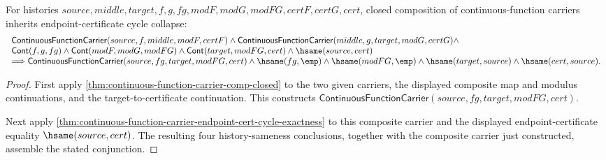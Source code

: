 \begin{theorem}
\label{thm:continuous-function-carrier-composite-endpoint-cycle-exactness}
For histories $source,middle,target,f,g,fg,modF,modG,modFG,certF,certG,cert$,
closed composition of continuous-function carriers inherits endpoint-certificate
cycle collapse:
$$
\begin{array}{l}
\mathsf{ContinuousFunctionCarrier}(source,f,middle,modF,certF)\wedge
\mathsf{ContinuousFunctionCarrier}(middle,g,target,modG,certG)\wedge
\\
\mathsf{Cont}(f,g,fg)\wedge
\mathsf{Cont}(modF,modG,modFG)\wedge
\mathsf{Cont}(target,modFG,cert)\wedge
\hsame(source,cert)
\\
\Longrightarrow
\mathsf{ContinuousFunctionCarrier}(source,fg,target,modFG,cert)\wedge
\hsame(fg,\emp)\wedge\hsame(modFG,\emp)\wedge
\hsame(target,source)\wedge\hsame(cert,source).
\end{array}
$$
\end{theorem}
\begin{proof}
First apply \autoref{thm:continuous-function-carrier-comp-closed} to the two
given carriers, the displayed composite map and modulus continuations, and the
target-to-certificate continuation. This constructs
$\mathsf{ContinuousFunctionCarrier}(source,fg,target,modFG,cert)$.

Next apply
\autoref{thm:continuous-function-carrier-endpoint-cert-cycle-exactness} to this
composite carrier and the displayed endpoint-certificate equality
$\hsame(source,cert)$. The resulting four history-sameness conclusions, together
with the composite carrier just constructed, assemble the stated conjunction.
\end{proof}

